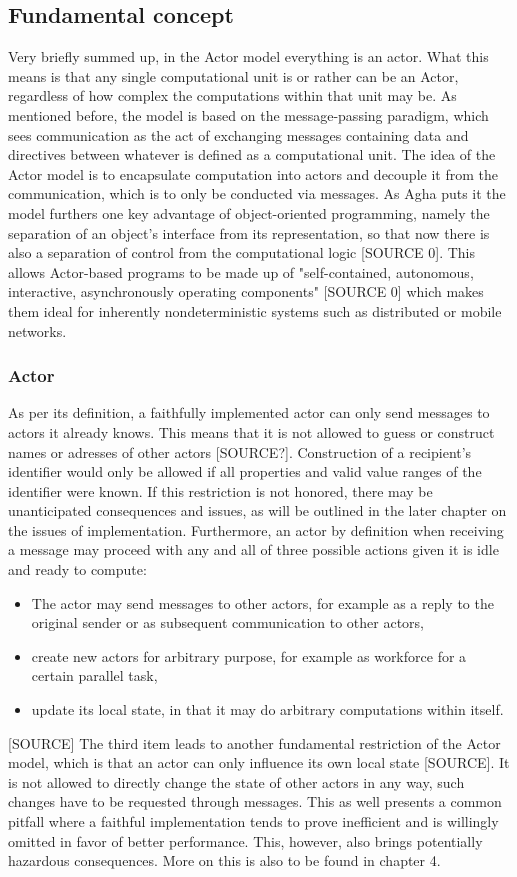 \documentclass[A4]{article}
\begin{document}
\subsection{Fundamental concept}
Very briefly summed up, in the Actor model everything is an actor. What this means is that any single computational unit is or rather can be an Actor, regardless of how complex the computations within that unit may be. 
As mentioned before, the model is based on the message-passing paradigm, which sees communication as the act of exchanging messages containing data and directives between whatever is defined as a computational unit. The idea of the Actor model is to encapsulate computation into actors and decouple it from the communication, which is to only be conducted via messages. As Agha puts it the model furthers one key advantage of object-oriented programming, namely the separation of an object's interface from its representation, so that now there is also a separation of control from the computational logic [SOURCE 0]. This allows Actor-based programs to be made up of "self-contained, autonomous, interactive, asynchronously operating components" [SOURCE 0] which makes them ideal for inherently nondeterministic systems such as distributed or mobile networks. 
\subsubsection{Actor}
As per its definition, a faithfully implemented actor can only send messages to actors it already knows. This means that it is not allowed to guess or construct names or adresses of other actors [SOURCE?]. Construction of a recipient's identifier would only be allowed if all properties and valid value ranges of the identifier were known. If this restriction is not honored, there may be unanticipated consequences and issues, as will be outlined in the later chapter on the issues of implementation. 
Furthermore, an actor by definition when receiving a message may proceed with any and all of three possible actions given it is idle and ready to compute: 
\begin{itemize}
\item The actor may send messages to other actors, for example as a reply to the original sender or as subsequent communication to other actors,
\item create new actors for arbitrary purpose, for example as workforce for a certain parallel task,
\item update its local state, in that it may do arbitrary computations within itself.
\end{itemize}[SOURCE]
The third item leads to another fundamental restriction of the Actor model, which is that an actor can only influence its own local state [SOURCE]. It is not allowed to directly change the state of other actors in any way, such changes have to be requested through messages. This as well presents a common pitfall where a faithful implementation tends to prove inefficient and is willingly omitted in favor of better performance. This, however, also brings potentially hazardous consequences. More on this is also to be found in chapter 4. 
\end{document}
